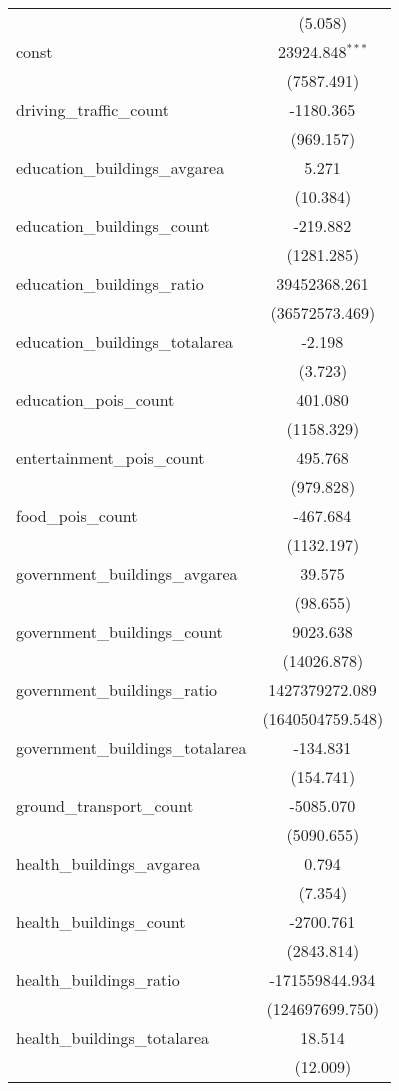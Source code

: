 \begin{table}[!htbp]
\begin{tabular}{@{\extracolsep{5pt}}lc}
  & (5.058) \\
 const & 23924.848$^{***}$ \\
  & (7587.491) \\
 driving_traffic_count & -1180.365$^{}$ \\
  & (969.157) \\
 education_buildings_avgarea & 5.271$^{}$ \\
  & (10.384) \\
 education_buildings_count & -219.882$^{}$ \\
  & (1281.285) \\
 education_buildings_ratio & 39452368.261$^{}$ \\
  & (36572573.469) \\
 education_buildings_totalarea & -2.198$^{}$ \\
  & (3.723) \\
 education_pois_count & 401.080$^{}$ \\
  & (1158.329) \\
 entertainment_pois_count & 495.768$^{}$ \\
  & (979.828) \\
 food_pois_count & -467.684$^{}$ \\
  & (1132.197) \\
 government_buildings_avgarea & 39.575$^{}$ \\
  & (98.655) \\
 government_buildings_count & 9023.638$^{}$ \\
  & (14026.878) \\
 government_buildings_ratio & 1427379272.089$^{}$ \\
  & (1640504759.548) \\
 government_buildings_totalarea & -134.831$^{}$ \\
  & (154.741) \\
 ground_transport_count & -5085.070$^{}$ \\
  & (5090.655) \\
 health_buildings_avgarea & 0.794$^{}$ \\
  & (7.354) \\
 health_buildings_count & -2700.761$^{}$ \\
  & (2843.814) \\
 health_buildings_ratio & -171559844.934$^{}$ \\
  & (124697699.750) \\
 health_buildings_totalarea & 18.514$^{}$ \\
  & (12.009) \\

\end{tabular}
\end{table}

